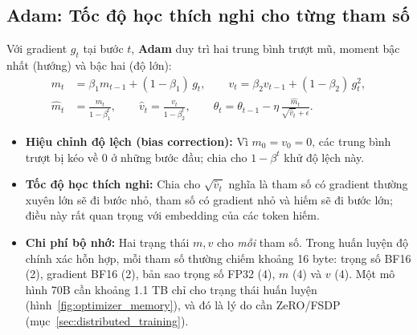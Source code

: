 \subsection{Adam: Tốc độ học thích nghi cho từng tham số}
\label{ssec:adam}
Với gradient $g_t$ tại bước $t$, \textbf{Adam} \cite{kingma2014adam} duy trì hai trung bình trượt mũ, moment bậc nhất (hướng) và bậc hai (độ lớn):
\begin{align}
	m_t &= \beta_1 m_{t-1} + (1-\beta_1)\, g_t, \qquad
	v_t = \beta_2 v_{t-1} + (1-\beta_2)\, g_t^2, \\
	\hat{m}_t &= \frac{m_t}{1-\beta_1^t}, \qquad \hat{v}_t = \frac{v_t}{1-\beta_2^t}, \qquad
	\theta_t = \theta_{t-1} - \eta\, \frac{\hat{m}_t}{\sqrt{\hat{v}_t} + \epsilon}.
\end{align}
\begin{itemize}
	\item \textbf{Hiệu chỉnh độ lệch (bias correction):} Vì $m_0 = v_0 = 0$, các trung bình trượt bị kéo về 0 ở những bước đầu; chia cho $1-\beta^t$ khử độ lệch này.
	\item \textbf{Tốc độ học thích nghi:} Chia cho $\sqrt{\hat{v}_t}$ nghĩa là tham số có gradient thường xuyên lớn sẽ đi bước nhỏ, tham số có gradient nhỏ và hiếm sẽ đi bước lớn; điều này rất quan trọng với embedding của các token hiếm.
	\item \textbf{Chi phí bộ nhớ:} Hai trạng thái $m, v$ cho \emph{mỗi} tham số. Trong huấn luyện độ chính xác hỗn hợp, mỗi tham số thường chiếm khoảng 16 byte: trọng số BF16 (2), gradient BF16 (2), bản sao trọng số FP32 (4), $m$ (4) và $v$ (4). Một mô hình 70B cần khoảng 1.1 TB chỉ cho trạng thái huấn luyện (hình~\ref{fig:optimizer_memory}), và đó là lý do cần ZeRO/FSDP (mục~\ref{sec:distributed_training}).
\end{itemize}

\begin{center}
\label{fig:adam_bias_step}
\end{center}



